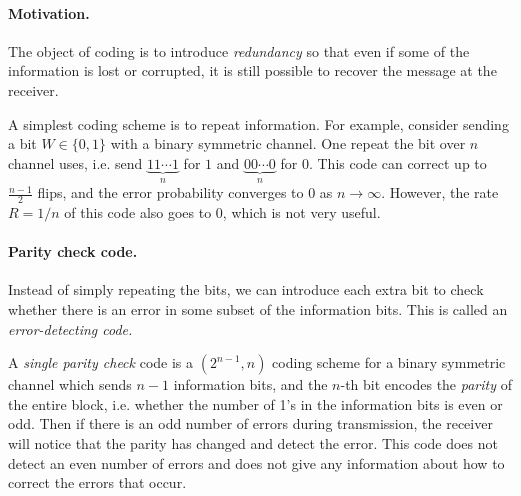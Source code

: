 \documentclass{article}
\numberwithin{equation}{section}
\theoremstyle{plain}
\theoremstyle{definition}
\begin{document}
\paragraph{Motivation.} The object of coding is to introduce \textit{redundancy} so that even if some of the information is lost or corrupted, it is still possible to recover the message at the receiver. 

A simplest coding scheme is to repeat information.  For example, consider sending a bit $W\in\{0,1\}$ with a binary symmetric channel. One repeat the bit over $n$ channel uses, i.e. send $\underbrace{11\cdots 1}_{n}$ for $1$ and $\underbrace{00\cdots 0}_{n}$ for $0$. This code can correct up to $\frac{n-1}{2}$ flips, and the error probability converges to $0$ as $n\to\infty$.
However, the rate $R=1/n$ of this code also goes to $0$, which is not very useful.

\paragraph{Parity check code.} Instead of simply repeating the bits, we can introduce each extra bit to check whether there is an error in some subset of the information bits. This is called an \textit{error-detecting code.}

A \textit{single parity check} code is a $(2^{n-1}, n)$ coding scheme for a binary symmetric channel which sends $n-1$ information bits, and the $n$-th bit encodes the \textit{parity} of the entire block, i.e. whether the number of 1’s in the information bits is even or odd. Then if there is an odd number of errors during transmission, the receiver will notice that the parity has changed and detect the error. This code does not detect an even number of errors and does not give any information about how to correct the errors that occur.
\end{document}
